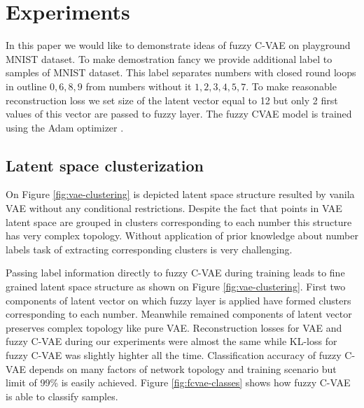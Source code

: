 \documentclass[runningheads]{llncs}
\begin{document}
\section{Experiments}

In this paper we would like to demonstrate ideas of fuzzy C-VAE on playground MNIST dataset.
To make demostration fancy we provide additional label to samples of MNIST dataset.
This label separates numbers with closed round loops in outline $0,6,8,9$ from numbers without it $1,2,3,4,5,7$.
To make reasonable reconstruction loss we set size of the latent vector equal to 12 but only 2 first values of this vector are passed to fuzzy layer.
The fuzzy CVAE model is trained using the Adam optimizer \cite{kingma2017adam}.

\subsection{Latent space clusterization}

On Figure \ref{fig:vae-clustering} is depicted latent space structure resulted by vanila VAE without any conditional restrictions.
Despite the fact that points in VAE latent space are grouped in clusters corresponding to each number this structure has very complex topology.
Without application of prior knowledge about number labels task of extracting corresponding clusters is very challenging.

Passing label information directly to fuzzy C-VAE during training leads to fine grained latent space structure as shown on Figure \ref{fig:vae-clustering}.
First two components of latent vector on which fuzzy layer is applied have formed clusters corresponding to each number.
Meanwhile remained components of latent vector preserves complex topology like pure VAE.
Reconstruction losses for VAE and fuzzy C-VAE during our experiments were almost the same while KL-loss for fuzzy C-VAE was slightly highter all the time.
Classification accuracy of fuzzy C-VAE depends on many factors of network topology and training scenario but limit of 99\% is easily achieved.
Figure \ref{fig:fcvae-classes} shows how fuzzy C-VAE is able to classify samples.
\end{document}

